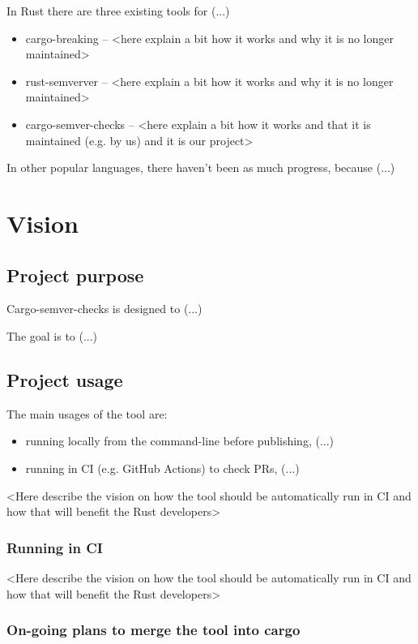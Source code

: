 \documentclass[licencjacka,en]{pracamgr}
\begin{document}
In Rust there are three existing tools for (...)
\begin{itemize}
	\item cargo-breaking -- <here explain a bit how it works and why it is no longer maintained>
	\item rust-semverver -- <here explain a bit how it works and why it is no longer maintained>
	\item cargo-semver-checks -- <here explain a bit how it works and that it is maintained (e.g. by us) and it is our project>
\end{itemize}

In other popular languages, there haven't been as much progress, because (...)



\chapter{Vision}\label{r:vision}

\section{Project purpose}

Cargo-semver-checks is designed to (...)

The goal is to (...)


\section{Project usage}

The main usages of the tool are:
\begin{itemize}
	\item running locally from the command-line before publishing, (...)
	\item running in CI (e.g. GitHub Actions) to check PRs, (...)
\end{itemize}

<Here describe the vision on how the tool should be automatically run in CI
and how that will benefit the Rust developers>

\subsection{Running in CI}

<Here describe the vision on how the tool should be automatically run in CI
and how that will benefit the Rust developers>

\subsection{On-going plans to merge the tool into cargo}
\end{document}
